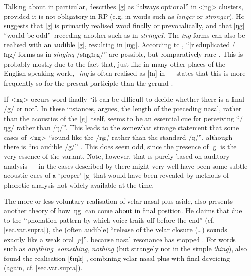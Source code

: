 Talking about  in particular, \citeauthor{knowles1973} describes [g] as ``always optional'' in <ng> clusters, provided it is not obligatory in RP (e.g. in words such as \emph{longer} or \emph{stronger}).
He suggests that [g] is primarily realised word finally or prevocalically, and that [ŋg] ``would be odd'' preceding another  such as in \emph{stringed}.
The \emph{ing}-forms can also be realised with an audible [g], resulting in [ɪŋg].
According to \citeauthor{knowles1973}, ``[r]eduplicated /ɪŋg/-forms as in \emph{singing} /sɪŋgɪŋg/'' are possible, but comparatively rare \citep[cf.][293]{knowles1973}.
This is probably mostly due to the fact that, just like in many other places of the English-speaking world, -\emph{ing} is often realised as [ɪn] in  --- \citeauthor{knowles1973} states that this is more frequently so for the present participle than the gerund \citeyearpar[cf.][156]{knowles1973}.

If <ng> occurs word finally ``it can be difficult to decide whether there is a final /g/ or not''.
In these instances, \citeauthor{knowles1973} argues, the length of the preceding nasal, rather than the acoustics of the [g] itself, seems to be an essential cue for perceiving ``/ŋg/ rather than /ŋ/''.
This leads \citeauthor{knowles1973} to the somewhat strange statement that some cases of <ng> ``sound like the  /ŋg/ rather than the standard /ŋ/'', although there is ``no audible /g/'' \citep[293]{knowles1973}.
This does seem odd, since the presence of [g] is the very essence of the  variant.
Note, however, that \citealt{knowles1973} is purely based on auditory analysis --- in the cases described by \citeauthor{knowles1973} there might very well have been some subtle acoustic cues of a `proper' [g] that would have been revealed by methods of phonetic analysis not widely available at the time.

The more or less voluntary realisation of velar nasal plus aside, \citeauthor{knowles1973} also presents another theory of how [ŋg] can come about in final position.
He claims that due to the ``phonation pattern by which voice trails off before the end'' (cf. \ref{sec.var.supra}), the (often audible) ``release of the velar closure (\ldots) sounds exactly like a weak oral [g]'', because nasal resonance has stopped \citep[cf.][294]{knowles1973}.
For words such as \emph{anything, something, nothing} (but strangely not in the simple \emph{thing}), \citeauthor{knowles1973} also found the realisation [θɪŋk] \citeyearpar[cf.][156]{knowles1973}, combining velar nasal plus with final devoicing (again, cf. \ref{sec.var.supra}).


